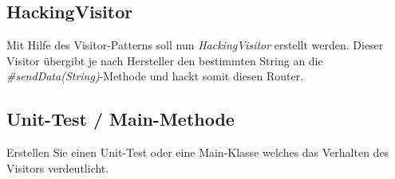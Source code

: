 \documentclass[oneside,a4paper]{scrartcl}
\begin{document}
\subsection{HackingVisitor}

Mit Hilfe des Visitor-Patterns soll nun \emph{HackingVisitor} erstellt werden.
Dieser Visitor übergibt je nach Hersteller den bestimmten String an die \emph{\#sendData(String)}-Methode und
hackt somit diesen Router.


\subsection{Unit-Test / Main-Methode}
Erstellen Sie einen Unit-Test oder eine Main-Klasse welches das Verhalten des Visitors verdeutlicht.
\end{document}
